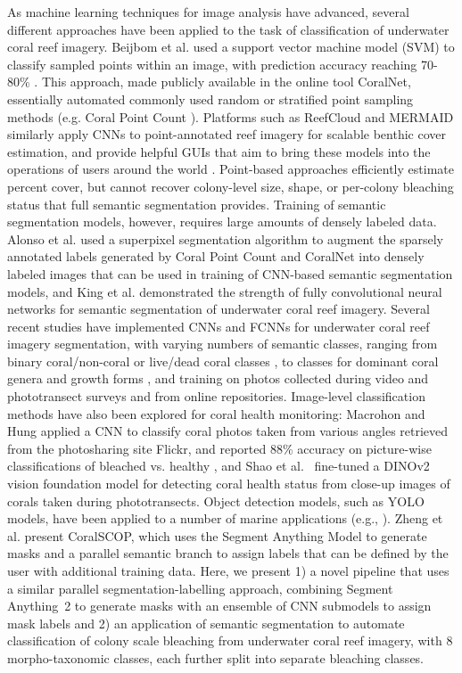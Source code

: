 \documentclass[11pt]{elsarticle}
\begin{document}
As machine learning techniques for image analysis have advanced, several different approaches have been applied to the task of classification of underwater coral reef imagery. Beijbom et al. used a support vector machine model (SVM) to classify sampled points within an image, with prediction accuracy reaching 70-80\% \citep{beijbom2012}. This approach, made publicly available in the online tool CoralNet, essentially automated commonly used random or stratified point sampling methods (e.g. Coral Point Count \citep{kohlergill2006}). Platforms such as ReefCloud and MERMAID similarly apply CNNs to point-annotated reef imagery for scalable benthic cover estimation, and provide helpful GUIs that aim to bring these models into the operations of users around the world \citep{gonzalezrivero2020,mermaid2026}. Point-based approaches efficiently estimate percent cover, but cannot recover colony-level size, shape, or per-colony bleaching status that full semantic segmentation provides. Training of semantic segmentation models, however, requires large amounts of densely labeled data. Alonso et al. \citep{alonso2017,alonso2019} used a superpixel segmentation algorithm to augment the sparsely annotated labels generated by Coral Point Count and CoralNet into densely labeled images that can be used in training of CNN-based semantic segmentation models, and King et al. \citep{king2018} demonstrated the strength of fully convolutional neural networks for semantic segmentation of underwater coral reef imagery. Several recent studies have implemented CNNs and FCNNs for underwater coral reef imagery segmentation, with varying numbers of semantic classes, ranging from binary coral/non-coral or live/dead coral classes \citep{zhang2022, kopecky2023, wang2026multiscale}, to classes for dominant coral genera and growth forms  \citep{zhang2024, li2024, lawson2025, zheng2025}, and training on photos collected during video and phototransect surveys and from online repositories. Image-level classification methods have also been explored for coral health monitoring: Macrohon and Hung applied a CNN to classify coral photos taken from various angles retrieved from the photosharing site Flickr, and reported 88\% accuracy on picture-wise classifications of bleached vs. healthy \citep{macrohonhung2025}, and Shao et al.\ \citep{shao2025multilabel} fine-tuned a DINOv2 vision foundation model for detecting coral health status from close-up images of corals taken during phototransects. Object detection models, such as YOLO models, have been applied to a number of marine applications (e.g., \citep{zhao2024rblyolo, zhao2025musselyolo}). Zheng et al. \citep{zheng2024} present CoralSCOP, which uses the Segment Anything Model \citep{kirillov2023segment} to generate masks and a parallel semantic branch to assign labels that can be defined by the user with additional training data. Here, we present 1) a novel pipeline that uses a similar parallel segmentation-labelling approach, combining Segment Anything~2 \citep{ravi2024sam2} to generate masks with an ensemble of CNN submodels to assign mask labels and 2) an application of semantic segmentation to automate classification of colony scale bleaching from underwater coral reef imagery, with 8 morpho-taxonomic classes, each further split into separate bleaching classes.
\end{document}

